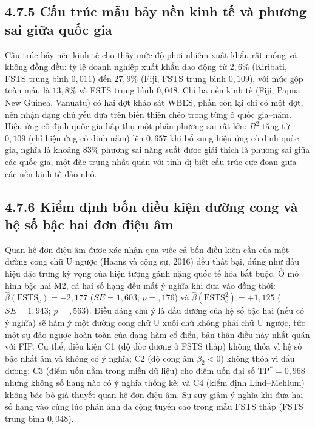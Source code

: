 \documentclass[
  a4paper,
  13pt]{extreport}
\begin{document}
\hypertarget{cux1ea5u-truxfac-mux1eabu-bux1ea3y-nux1ec1n-kinh-tux1ebf-vuxe0-phux1b0ux1a1ng-sai-giux1eefa-quux1ed1c-gia}{%
\subsection{4.7.5 Cấu trúc mẫu bảy nền kinh tế và phương sai giữa quốc
gia}\label{cux1ea5u-truxfac-mux1eabu-bux1ea3y-nux1ec1n-kinh-tux1ebf-vuxe0-phux1b0ux1a1ng-sai-giux1eefa-quux1ed1c-gia}}

Cấu trúc bảy nền kinh tế cho thấy mức độ phơi nhiễm xuất khẩu rất mỏng
và không đồng đều: tỷ lệ doanh nghiệp xuất khẩu dao động từ \(2{,}6\%\)
(Kiribati, FSTS trung bình \(0{,}011\)) đến \(27{,}9\%\) (Fiji, FSTS
trung bình \(0{,}109\)), với mức gộp toàn mẫu là \(13{,}8\%\) và FSTS
trung bình \(0{,}048\). Chỉ ba nền kinh tế (Fiji, Papua New Guinea,
Vanuatu) có hai đợt khảo sát WBES, phần còn lại chỉ có một đợt, nên nhận
dạng chủ yếu dựa trên biến thiên chéo trong từng ô quốc gia--năm. Hiệu
ứng cố định quốc gia hấp thụ một phần phương sai rất lớn: \(R^2\) tăng
từ \(0{,}109\) (chỉ hiệu ứng cố định năm) lên \(0{,}657\) khi bổ sung
hiệu ứng cố định quốc gia, nghĩa là khoảng \(83\%\) phương sai năng suất
được giải thích là phương sai giữa các quốc gia, một đặc trưng nhất quán
với tính dị biệt cấu trúc cực đoan giữa các nền kinh tế đảo nhỏ.

\hypertarget{kiux1ec3m-ux111ux1ecbnh-bux1ed1n-ux111iux1ec1u-kiux1ec7n-ux111ux1b0ux1eddng-cong-vuxe0-hux1ec7-sux1ed1-bux1eadc-hai-ux111ux1a1n-ux111iux1ec7u-uxe2m}{%
\subsection{4.7.6 Kiểm định bốn điều kiện đường cong và hệ số bậc hai
đơn điệu
âm}\label{kiux1ec3m-ux111ux1ecbnh-bux1ed1n-ux111iux1ec1u-kiux1ec7n-ux111ux1b0ux1eddng-cong-vuxe0-hux1ec7-sux1ed1-bux1eadc-hai-ux111ux1a1n-ux111iux1ec7u-uxe2m}}

Quan hệ đơn điệu âm được xác nhận qua việc cả bốn điều kiện cần của một
đường cong chữ U ngược (Haans và cộng sự, 2016) đều thất bại, đúng như
dấu hiệu đặc trưng kỳ vọng của hiện tượng gánh nặng quốc tế hóa bắt
buộc. Ở mô hình bậc hai M2, cả hai số hạng đều mất ý nghĩa khi đưa vào
đồng thời: \(\hat{\beta}(\text{FSTS}_c) = -2{,}177\) (\(SE = 1{,}603\);
\(p = {,}176\)) và \(\hat{\beta}(\text{FSTS}_c^2) = +1{,}125\)
(\(SE = 1{,}943\); \(p = {,}563\)). Điều đáng chú ý là dấu dương của hệ
số bậc hai (nếu có ý nghĩa) sẽ hàm ý một đường cong chữ U xuôi chứ không
phải chữ U ngược, tức một sự đảo ngược hoàn toàn của dạng hàm cổ điển,
bản thân điều này nhất quán với FIP. Cụ thể, điều kiện C1 (độ dốc dương
ở FSTS thấp) không thỏa vì hệ số bậc nhất âm và không có ý nghĩa; C2 (độ
cong âm \(\beta_2 < 0\)) không thỏa vì dấu dương; C3 (điểm uốn nằm trong
miền dữ liệu) cho điểm uốn đại số \(\text{TP}^* = 0{,}968\) nhưng không
số hạng nào có ý nghĩa thống kê; và C4 (kiểm định Lind--Mehlum) không
bác bỏ giả thuyết quan hệ đơn điệu âm. Sự suy giảm ý nghĩa khi đưa hai
số hạng vào cùng lúc phản ánh đa cộng tuyến cao trong mẫu FSTS thấp
(FSTS trung bình \(0{,}048\)).
\end{document}
